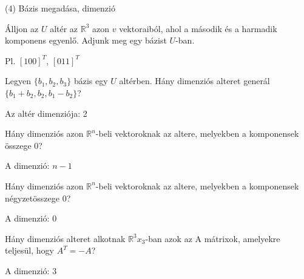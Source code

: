 \begin{frame}[plain]
\begin{tcolorbox}[center, colback={myyellow}, coltext={black}, colframe={myyellow}]
    {\RHuge  (4) Bázis megadása, dimenzió}
    \mmedskip
\end{tcolorbox}
\end{frame}

\begin{frame}
  \begin{tcolorbox}[title={4/1. {\symknight}}]
      Álljon az $U$ altér az $\mathbb{R}^3$ azon $v$ vektoraiból, ahol a második és a harmadik komponens egyenlő. Adjunk meg egy bázist $U$-ban.
  \tcblower

    \mmedskip 
    
    Pl. $[1 0 0]^T$, $[0 1 1]^T$
  \end{tcolorbox}
\end{frame}


\begin{frame}
  \begin{tcolorbox}[title={4/2. {\symknight}}]
      Legyen $\{b_1,b_2,b_3\}$ bázis egy $U$ altérben. Hány dimenziós alteret generál $\{b_1 + b_2,b_2,b_1 -b_2\}$?
  \tcblower

    \mmedskip 
    
    Az altér dimenziója: 2
  \end{tcolorbox}
\end{frame}


\begin{frame}
  \begin{tcolorbox}[title={4/3. {\symrook}}]
      Hány dimenziós azon $\mathbb{R}^n$-beli vektoroknak az altere, melyekben a komponensek összege $0$?
  \tcblower

    \mmedskip 
    
    A dimenzió: $n-1$
  \end{tcolorbox}
\end{frame}


\begin{frame}
  \begin{tcolorbox}[title={4/4. {\symrook}}]
      Hány dimenziós azon $\mathbb{R}^n$-beli vektoroknak az altere, melyekben a komponensek négyzetösszege $0$?
  \tcblower

    \mmedskip 
    
    A dimenzió: $0$
  \end{tcolorbox}
\end{frame}


\begin{frame}
  \begin{tcolorbox}[title={4/5. {\symqueen}}]
      Hány dimenziós alteret alkotnak $\mathbb{R}^3x_3$-ban azok az A mátrixok, amelyekre teljesül, hogy $A^T = -A$?
  \tcblower

    \mmedskip 
    
    A dimenzió: $3$
  \end{tcolorbox}
\end{frame}


